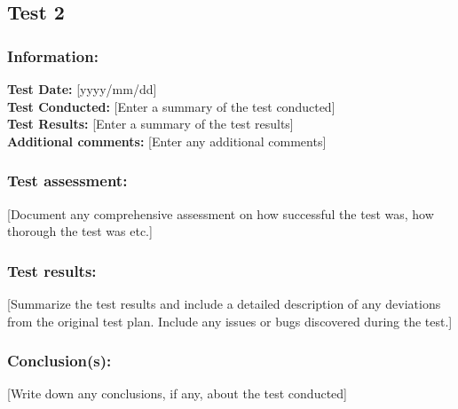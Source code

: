 \documentclass{article}
\newcommand\tab[1][1cm]{\hspace*{#1}}
\begin{document}
      \subsection{Test 2}
          \subsubsection{Information:}
              \tab \textbf{Test Date:} [yyyy/mm/dd]\\
              \tab \textbf{Test Conducted:} [Enter a summary of the test conducted]\\
              \tab \textbf{Test Results:} [Enter a summary of the test results]\\
              \tab \textbf{Additional comments:} [Enter any additional comments]\\

          \subsubsection{Test assessment:}
              [Document any comprehensive assessment on how successful the test was, how thorough the test was etc.]

          \subsubsection{Test results:}
              [Summarize the test results and include a detailed description of any deviations from the original test plan. Include any issues or bugs discovered during the test.]

          \subsubsection{Conclusion(s):}
              [Write down any conclusions, if any, about the test conducted]
\end{document}
